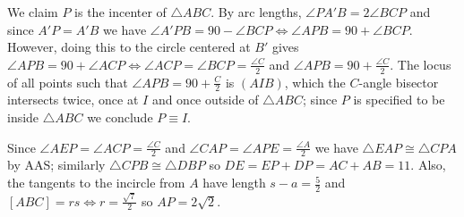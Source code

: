 \begin{solution}\hfil\medskip
  
    \begin{figure}
        \centering
    \end{figure}

    We claim $P$ is the incenter of $\triangle ABC$. By arc lengths, $\angle{PA'B} = 2 \angle BCP$ and since $A'P = A'B$ we have $\angle A'PB = 90 - \angle BCP \iff \angle APB = 90 + \angle BCP$.
    However, doing this to the circle centered at $B'$ gives $\angle APB = 90 + \angle ACP \iff \angle ACP = \angle BCP = \frac{\angle C}{2}$ and $\angle APB = 90 + \frac{\angle C}{2}$.
    The locus of all points such that $\angle APB = 90 + \frac{C}{2}$ is $(AIB)$, which the $C$-angle bisector intersects twice, once at $I$ and once outside of $\triangle ABC$; since $P$
    is specified to be inside $\triangle ABC$ we conclude $P \equiv I$. \medskip

    Since $\angle AEP = \angle ACP = \frac{\angle C}{2}$ and $\angle CAP = \angle APE = \frac{\angle A}{2}$ we have $\triangle{EAP} \cong \triangle CPA$ by AAS;
    similarly $\triangle CPB \cong \triangle DBP$ so $DE = EP + DP = AC + AB = 11$. Also, the tangents to the incircle from $A$ have length $s - a = \frac{5}{2}$
    and $[ABC] = rs \iff r = \frac{\sqrt7}{2}$ so $AP = 2 \sqrt 2$. 
\end{solution}\bigskip

